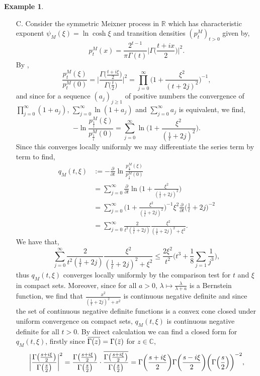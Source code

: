 \documentclass[a4paper, 12pt]{report}
\theoremstyle{cor}
\theoremstyle{remark}
\theoremstyle{definition}
\newtheorem{eg}[theorem]{Example}
\newcommand{\overbar}[1]{\mkern 1.5mu\overline{\mkern-1.5mu#1\mkern-1.5mu}\mkern 1.5mu}
\begin{document}
\begin{eg}
\begin{itemize}
\item[C.] Consider the symmetric Meixner process in $\mathbb{R}$ which has characteristic exponent $\psi_M(\xi) = \ln\cosh\xi$ and transition densities $(p_t^M)_{t > 0}$ given by,
\begin{equation}\label{SMPTD}
p_t^M(x) = \frac{2^{t - 1}}{\pi\Gamma(t)}\bigg|\Gamma\Big(\frac{t + ix}{2}\Big)\bigg|^2.
\end{equation}
By \cite[Example 5.4]{DProofPaper},
$$
\frac{p_t^M(\xi)}{p_t^M(0)} = \bigg|\frac{\Gamma\big(\frac{t + i\xi}{2}\big)}{\Gamma\big(\frac{t}{2}\big)}\bigg|^2 = \prod_{j = 0}^\infty\bigg(1 + \frac{\xi^2}{(t + 2j)^2}\bigg)^{-1},
$$
and since for a sequence $(a_j)_{j \ge 1}$ of positive numbers the convergence of $\prod_{j = 0}^\infty(1 + a_j)$, $\sum_{j = 0}^\infty\ln(1 + a_j)$ and $\sum_{j = 0}^\infty a_j$ is equivalent, we find,
$$
-\ln\frac{p_\frac{1}{t}^M(\xi)}{p_\frac{1}{t}^M(0)} = \sum_{j = 0}^\infty\ln\bigg(1 + \frac{\xi^2}{(\frac{1}{t} + 2j)^2}\bigg).
$$
Since this converges locally uniformly we may differentiate the series term by term to find,
$$
\begin{aligned}
q_M(t, \xi) & := -\frac{\partial}{\partial t}\ln\frac{p_\frac{1}{t}^M(\xi)}{p_\frac{1}{t}^M(0)}\\
& = \sum_{j = 0}^\infty\frac{\partial}{\partial t}\ln\bigg(1 + \frac{\xi^2}{(\frac{1}{t} + 2j)^2}\bigg)\\
& = \sum_{j = 0}^\infty\bigg(1 + \frac{\xi^2}{(\frac{1}{t} + 2j)^2}\bigg)^{-1}\xi^2\frac{\partial}{\partial t}\Big(\frac{1}{t} + 2j\Big)^{-2}\\
& = \sum_{j = 0}^\infty\frac{2}{t^2(\frac{1}{t} + 2j)}\frac{\xi^2}{(\frac{1}{t} + 2j)^2 + \xi^2}.
\end{aligned}
$$
We have that,
$$
\sum_{j = 0}^\infty\frac{2}{t^2(\frac{1}{t} + 2j)}\frac{\xi^2}{(\frac{1}{t} + 2j)^2 + \xi^2} \le \frac{2\xi^2}{t^2}\bigg(t^3 + \frac{1}{8}\sum_{j = 1}\frac{1}{j^3}\bigg),
$$
thus $q_M(t, \xi)$ converges locally uniformly by the comparison test for $t$ and $\xi$ in compact sets.  Moreover, since for all $a > 0$, $\lambda \mapsto \frac{\lambda}{\lambda + a}$ is a Bernstein function, we find that $\frac{x^2}{(\frac{1}{t} + 2j)^2 + x^2}$ is continuous negative definite and since the set of continuous negative definite functions is a convex cone closed under uniform convergence on compact sets, $q_M(t, \xi)$ is continuous negative definite for all $t > 0$.  By direct calculation we can find a closed form for $q_M(t, \xi)$, firstly since $\overbar{\Gamma(z)} = \Gamma(\bar{z})$ for $z \in \mathbb{C}$,
$$
\bigg|\frac{\Gamma\big(\frac{s + i\xi}{2}\big)}{\Gamma\big(\frac{s}{2}\big)}\bigg|^2 = \frac{\Gamma\big(\frac{s + i\xi}{2}\big)}{\Gamma\big(\frac{s}{2}\big)}\cdot\overbar{\frac{\Gamma\big(\frac{s + i\xi}{2}\big)}{\Gamma\big(\frac{s}{2}\big)}} = \Gamma\bigg(\frac{s + i\xi}{2}\bigg)\Gamma\bigg(\frac{s - i\xi}{2}\bigg)\bigg(\Gamma\Big(\frac{s}{2}\Big)\bigg)^{-2},
$$
\end{itemize}
\end{eg}
\end{document}
